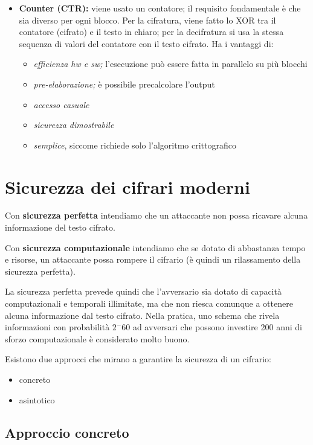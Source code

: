 \begin{itemize}
    \item \textbf{Counter (CTR):} viene usato un contatore; il requisito fondamentale è che sia diverso per ogni blocco. Per la cifratura, viene fatto lo
    XOR tra il contatore (cifrato) e il testo in chiaro; per la decifratura si usa la stessa sequenza di valori del contatore con il testo cifrato. Ha i vantaggi di:
    \begin{itemize}
        \item \textit{efficienza hw e sw;} l'esecuzione può essere fatta in parallelo su più blocchi
        \item \textit{pre-elaborazione;} è possibile precalcolare l'output 
        \item \textit{accesso casuale}
        \item \textit{sicurezza dimostrabile}
        \item \textit{semplice}, siccome richiede solo l'algoritmo crittografico 
    \end{itemize}
\end{itemize}

\section{Sicurezza dei cifrari moderni}
Con \textbf{sicurezza perfetta} intendiamo che un attaccante non possa ricavare alcuna informazione del testo cifrato. 

\noindent Con \textbf{sicurezza computazionale} intendiamo che se dotato di abbastanza tempo e risorse, un attaccante possa rompere il cifrario (è quindi 
un rilassamento della sicurezza perfetta). 

\noindent La sicurezza perfetta prevede quindi che l'avversario sia dotato di capacità computazionali e temporali illimitate, ma che non riesca 
comunque a ottenere alcuna informazione dal testo cifrato. Nella pratica, uno schema che rivela informazioni con probabilità $2^-60$ ad avversari 
che possono investire 200 anni di sforzo computazionale è considerato molto buono. 

Esistono due approcci che mirano a garantire la sicurezza di un cifrario:
\begin{itemize}
    \item concreto 
    \item asintotico
\end{itemize}

\subsection{Approccio concreto}

